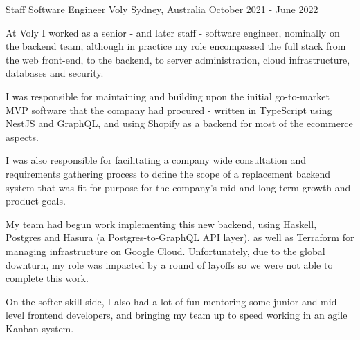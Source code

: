 


\begin{cventries}


\cventry
{Staff Software Engineer} %
{Voly} %
{Sydney, Australia} %
{October 2021 - June 2022} %
{ %
\begin{cvitems}
  \item {At Voly I worked as a senior - and later staff - software engineer, nominally on the backend team, although in practice my role encompassed the full stack from the web front-end, to the backend, to server administration, cloud infrastructure, databases and security.}
  \item {I was responsible for maintaining and building upon the initial go-to-market MVP software that the company had procured - written in TypeScript using NestJS and GraphQL, and using Shopify as a backend for most of the ecommerce aspects.}
  \item {I was also responsible for facilitating a company wide consultation and requirements gathering process to define the scope of a replacement backend system that was fit for purpose for the company's mid and long term growth and product goals.}
  \item {My team had begun work implementing this new backend, using Haskell, Postgres and Hasura (a Postgres-to-GraphQL API layer), as well as Terraform for managing infrastructure on Google Cloud. Unfortunately, due to the global downturn, my role was impacted by a round of layoffs so we were not able to complete this work.}
  \item {On the softer-skill side, I also had a lot of fun mentoring some junior and mid-level frontend developers, and bringing my team up to speed working in an agile Kanban system.}
\end{cvitems}
\vspace{2.0mm}
}


\end{cventries}
